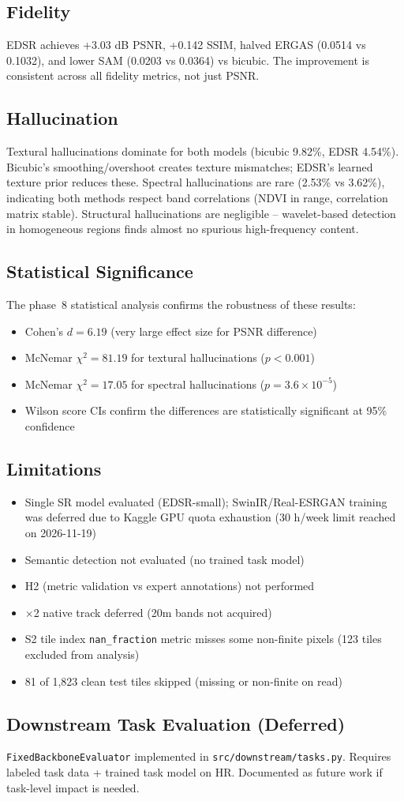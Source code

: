 \subsection{Fidelity}
EDSR achieves +3.03 dB PSNR, +0.142 SSIM, halved ERGAS (0.0514 vs 0.1032), and lower SAM (0.0203 vs 0.0364) vs bicubic. The improvement is consistent across all fidelity metrics, not just PSNR.

\subsection{Hallucination}
Textural hallucinations dominate for both models (bicubic 9.82\%, EDSR 4.54\%). Bicubic's smoothing/overshoot creates texture mismatches; EDSR's learned texture prior reduces these. Spectral hallucinations are rare (2.53\% vs 3.62\%), indicating both methods respect band correlations (NDVI in range, correlation matrix stable). Structural hallucinations are negligible -- wavelet-based detection in homogeneous regions finds almost no spurious high-frequency content.

\subsection{Statistical Significance}
The phase~8 statistical analysis confirms the robustness of these results:
\begin{itemize}
    \item Cohen's $d = 6.19$ (very large effect size for PSNR difference)
    \item McNemar $\chi^2 = 81.19$ for textural hallucinations ($p < 0.001$)
    \item McNemar $\chi^2 = 17.05$ for spectral hallucinations ($p = 3.6 \times 10^{-5}$)
    \item Wilson score CIs confirm the differences are statistically significant at 95\% confidence
\end{itemize}

\subsection{Limitations}
\begin{itemize}
    \item Single SR model evaluated (EDSR-small); SwinIR/Real-ESRGAN training was deferred due to Kaggle GPU quota exhaustion (30 h/week limit reached on 2026-11-19)
    \item Semantic detection not evaluated (no trained task model)
    \item H2 (metric validation vs expert annotations) not performed
    \item $\times$2 native track deferred (20m bands not acquired)
    \item S2 tile index \texttt{nan\_fraction} metric misses some non-finite pixels (123 tiles excluded from analysis)
    \item 81 of 1,823 clean test tiles skipped (missing or non-finite on read)
\end{itemize}

\subsection{Downstream Task Evaluation (Deferred)}
\texttt{FixedBackboneEvaluator} implemented in \texttt{src/downstream/tasks.py}. Requires labeled task data + trained task model on HR. Documented as future work if task-level impact is needed.
